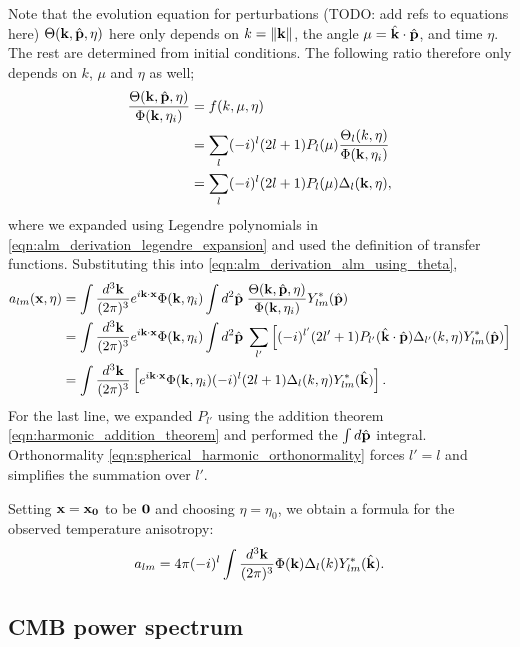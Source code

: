 Note that the evolution equation for perturbations (TODO: add refs to equations here) $\Theta(\mathbf{k},\hat{\mathbf{p}},\eta)$ here only depends on $k=\|\mathbf{k}\|$, the angle $\mu = \hat{\mathbf{k}} \cdot \hat{\mathbf{p}}$, and time $\eta$. The rest are determined from initial conditions. The following ratio therefore only depends on $k$, $\mu$ and $\eta$ as well;
\begin{align}
	\frac{\Theta(\mathbf{k},\hat{\mathbf{p}},\eta)}{\Phi(\mathbf{k},\eta_i)} &= f(k, \mu, \eta) \\
	&= \sum_l (-i)^l (2l+1) P_l(\mu) \frac{\Theta_l(k,\eta)}{\Phi(\mathbf{k},\eta_i)} \label{eqn:alm_derivation_legendre_expansion}\\ 
	&= \sum_l (-i)^l (2l+1) P_l(\mu) \Delta_l(\mathbf{k},\eta),
\end{align}
where we expanded using Legendre polynomials in \eqref{eqn:alm_derivation_legendre_expansion} and used the definition of transfer functions. Substituting this into \eqref{eqn:alm_derivation_alm_using_theta},
\begin{align}
	a_{lm}(\mathbf{x},\eta) &= \int \frac{d^3\mathbf{k}}{(2\pi)^3} e^{i\mathbf{k}\cdot\mathbf{x}} \Phi(\mathbf{k}, \eta_i) \int d^2\hat{\mathbf{p}} \; \frac{\Theta(\mathbf{k},\hat{\mathbf{p}},\eta)}{\Phi(\mathbf{k}, \eta_i)} Y^*_{lm}(\hat{\mathbf{p}}) \\
	&= \int \frac{d^3\mathbf{k}}{(2\pi)^3} e^{i\mathbf{k}\cdot\mathbf{x}} \Phi(\mathbf{k}, \eta_i) \int d^2\hat{\mathbf{p}} \; \sum_{l'} \left[ (-i)^{l'} (2l'+1) P_{l'}(\hat{\mathbf{k}}\cdot\hat{\mathbf{p}}) \Delta_{l'}(k,\eta) Y^*_{lm}(\hat{\mathbf{p}}) \right] \\
	&= \int \frac{d^3\mathbf{k}}{(2\pi)^3} \left[ e^{i\mathbf{k}\cdot\mathbf{x}} \Phi(\mathbf{k}, \eta_i) (-i)^{l} (2l+1) \Delta_{l}(k,\eta) Y^*_{lm}(\hat{\mathbf{k}}) \right].
\end{align}
For the last line, we expanded $P_{l'}$ using the addition theorem \eqref{eqn:harmonic_addition_theorem} and performed the $\int d\hat{\mathbf{p}}$ integral. Orthonormality \eqref{eqn:spherical_harmonic_orthonormality} forces $l'=l$ and simplifies the summation over $l'$.

Setting $\mathbf{x}=\mathbf{x_0}$ to be $\mathbf{0}$ and choosing $\eta=\eta_0$, we obtain a formula for the observed temperature anisotropy:
\begin{align}
	a_{lm} = 4\pi (-i)^l \int \frac{d^3\mathbf{k}}{(2\pi)^3} \Phi(\mathbf{k}) \Delta_{l}(k) Y^*_{lm}(\hat{\mathbf{k}}). \label{eqn:alm_from_phi}
\end{align}

\subsection{CMB power spectrum}

